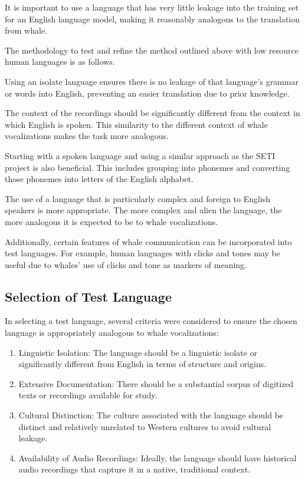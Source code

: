 \documentclass{article}
\begin{document}
It is important to use a language that has very little leakage into the training set for an English language model, making it reasonably analogous to the translation from whale.

The methodology to test and refine the method outlined above with low resource human languages is as follows.

Using an isolate language ensures there is no leakage of that language's grammar or words into English, preventing an easier translation due to prior knowledge.

The context of the recordings should be significantly different from the context in which English is spoken. This similarity to the different context of whale vocalizations makes the task more analogous.

Starting with a spoken language and using a similar approach as the SETI project is also beneficial. This includes grouping into phonemes and converting those phonemes into letters of the English alphabet.

The use of a language that is particularly complex and foreign to English speakers is more appropriate. The more complex and alien the language, the more analogous it is expected to be to whale vocalizations.

Additionally, certain features of whale communication can be incorporated into test languages. For example, human languages with clicks and tones may be useful due to whales' use of clicks and tone as markers of meaning.

\subsection{Selection of Test Language}
In selecting a test language, several criteria were considered to ensure the chosen language is appropriately analogous to whale vocalizations:
\begin{enumerate}
    \item Linguistic Isolation: The language should be a linguistic isolate or significantly different from English in terms of structure and origins.
    \item Extensive Documentation: There should be a substantial corpus of digitized texts or recordings available for study.
    \item Cultural Distinction: The culture associated with the language should be distinct and relatively unrelated to Western cultures to avoid cultural leakage.
    \item Availability of Audio Recordings: Ideally, the language should have historical audio recordings that capture it in a native, traditional context.
\end{enumerate}
\end{document}
